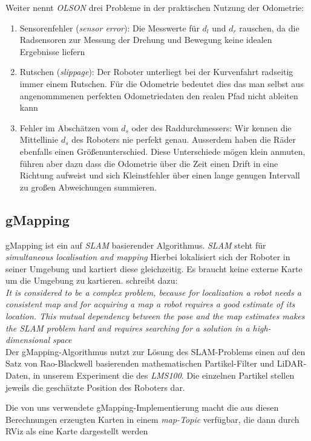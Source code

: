 \documentclass[11pt,a4paper]{article}
\begin{document}
Weiter nennt \textit{OLSON} drei Probleme in der praktischen Nutzung der Odometrie:
\begin{enumerate}
  \item Sensorenfehler (\textit{sensor error}):
  Die Messwerte für $d_l$ und $d_r$ rauschen, da die Radsensoren zur Messung der Drehung und Bewegung keine idealen Ergebnisse liefern
  \item Rutschen (\textit{slippage}):
  Der Roboter unterliegt bei der Kurvenfahrt radseitig immer einem Rutschen. Für die Odometrie bedeutet dies das man selbst aus angenommmenen perfekten Odometriedaten
  den realen Pfad nicht ableiten kann
  \item Fehler im Abschätzen vom $d_s$ oder des Raddurchmessers:
  Wir kennen die Mittellinie $d_s$ des Roboters nie perfekt genau. Ausserdem haben die Räder ebenfalls einen Größenunterschied. Diese Unterschiede mögen klein 
  anmuten, führen aber dazu dass die Odometrie über die Zeit einen Drift in eine Richtung aufweist und sich Kleinstfehler über einen lange genugen Intervall zu großen
  Abweichungen summieren. 
\end{enumerate}

\subsection*{gMapping}
gMapping ist ein auf \textit{SLAM} basierender Algorithmus. \textit{SLAM} steht für \textit{simultaneous localisation and mapping}\cite{website:mathworksSLAM}
Hierbei lokalisiert sich der Roboter in seiner Umgebung und kartiert diese gleichzeitig. Es braucht keine externe Karte um die Umgebung zu kartieren.
\cite{raoblackwellgmapping} schreibt dazu: \\
\textit{ It is
considered to be a complex problem, because for localization
a robot needs a consistent map and for acquiring a map a
robot requires a good estimate of its location. This mutual
dependency between the pose and the map estimates makes
the SLAM problem hard and requires searching for a solution
in a high-dimensional space} \\
Der gMapping-Algorithmus nutzt zur Lösung des SLAM-Problems einen auf den Satz von Rao-Blackwell basierenden mathematischen Partikel-Filter und LiDAR-Daten\cite{website:openslamgmapping},
in unserem Experiment die des \textit{LMS100}. Die einzelnen Partikel stellen jeweils die geschätzte Position des Roboters dar. 

Die von uns verwendete gMapping-Implementierung macht die aus diesen Berechnungen erzeugten Karten in einem \textit{map-Topic} verfügbar, die dann durch RViz als eine 
Karte dargestellt werden\cite{website:gmapping}
\end{document}
